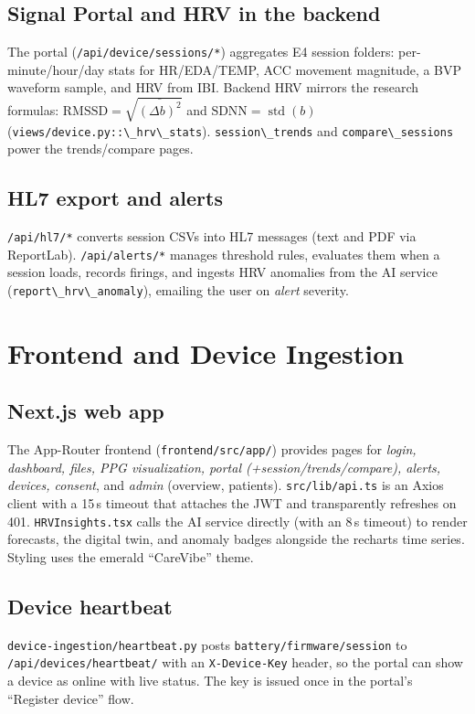 \documentclass[11pt,a4paper]{article}
\newcommand{\code}[1]{\lstinline[basicstyle=\ttfamily\normalsize]!#1!}
\begin{document}
\subsection{Signal Portal and HRV in the backend}
The portal (\code{/api/device/sessions/*}) aggregates E4 session folders:
per-minute/hour/day stats for HR/EDA/TEMP, ACC movement magnitude, a BVP
waveform sample, and HRV from IBI. Backend HRV mirrors the research formulas:
$\text{RMSSD}=\sqrt{\overline{(\Delta b)^2}}$ and $\text{SDNN}=\operatorname{std}(b)$
(\code{views/device.py::\_hrv\_stats}). \code{session\_trends} and
\code{compare\_sessions} power the trends/compare pages.

\subsection{HL7 export and alerts}
\code{/api/hl7/*} converts session CSVs into HL7 messages (text and PDF via
ReportLab). \code{/api/alerts/*} manages threshold rules, evaluates them when
a session loads, records firings, and ingests HRV anomalies from the AI service
(\code{report\_hrv\_anomaly}), emailing the user on \emph{alert} severity.

\section{Frontend and Device Ingestion}\label{sec:frontend}

\subsection{Next.js web app}
The App-Router frontend (\code{frontend/src/app/}) provides pages for
\emph{login, dashboard, files, PPG visualization, portal
(+session/trends/compare), alerts, devices, consent}, and \emph{admin}
(overview, patients). \code{src/lib/api.ts} is an Axios client with a 15\,s
timeout that attaches the JWT and transparently refreshes on 401.
\code{HRVInsights.tsx} calls the AI service directly (with an 8\,s timeout) to
render forecasts, the digital twin, and anomaly badges alongside the recharts
time series. Styling uses the emerald ``CareVibe'' theme.

\subsection{Device heartbeat}
\code{device-ingestion/heartbeat.py} posts \code{battery/firmware/session} to
\code{/api/devices/heartbeat/} with an \code{X-Device-Key} header, so the portal
can show a device as online with live status. The key is issued once in the
portal's ``Register device'' flow.
\end{document}
